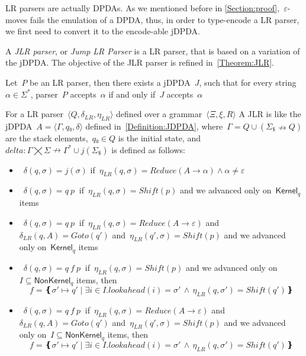 LR parsers are actually DPDAs\@. As we mentioned before in \cref{Section:proof},~$ε$-moves
  fails the emulation of a DPDA, thus, in order to type-encode a LR parser, we first need
  to convert it to the encode-able jDPDA\@.

A \emph{JLR parser}, or \emph{Jump LR Parser} is a LR parser, that
  is based on a variation of the jDPDA\@.
The objective of the JLR parser is refined in~\cref{Theorem:JLR}.

\begin{Theorem}
  \label{Theorem:JLR}
  Let~$P$ be an LR parser, then there exists a jDPDA~$J$,
  such that for every string~$α∈Σ^*$, parser~$P$ accepts~$α$
    if and only if~$J$ accepts~$α$
\end{Theorem}

For a LR parser~$⟨Q,δ_{LR}, η_{LR}⟩$ defined over a grammar~$⟨Ξ,ξ,R⟩$
A JLR is like the jDPDA~$A=⟨Γ,q₀,δ⟩$ defined in~\cref{Definition:JDPDA},
  where~$Γ= Q∪(Σ_\$↛Q)$ are the stack elements,~$q₀∈Q$
  is the initial state, and~$delta:Γ⨉Σ↛Γ^*∪j(Σ_\$)$ is defined as follows:
  \begin{itemize}
   \item~$δ(q,σ)= j(σ)$ if~$η_{LR}(q,σ)=Reduce(A→α)∧α≠ε$


   \item~$δ(q,σ)= q \: p~$ if~$η_{LR}(q,σ)=Shift(p)$ and we advanced only on~$\textsf{Kernel}_q$ items
   \item~$δ(q,σ)= q \: p~$ if~$η_{LR}(q,σ)=Reduce(A→ε)$
     and~$δ_{LR}(q,A)=Goto(q')$ and~$η_{LR}(q',σ)=Shift(p)$
     and we advanced only on~$\textsf{Kernel}_q$ items


   \item~$δ(q,σ)= q \: f \: p~$ if~$η_{LR}(q,σ)=Shift(p)$ and we advanced only on~$I⊆\textsf{NonKernel}_q$
     items, then
    \[
      f = ❴σ' \mapsto q' \; | \;∃i∈I . lookahead(i)=σ' \,∧\, η_{LR}(q,σ')=Shift(q')❵
    \]

   \item~$δ(q,σ)= q \: f \: p~$ if~$η_{LR}(q,σ)=Reduce(A→ε)$
     and~$δ_{LR}(q,A)=Goto(q')$ and~$η_{LR}(q',σ)=Shift(p)$
     and we advanced only on~$I⊆\textsf{NonKernel}_q$
     items, then
     \[
      f = ❴σ' \mapsto q' \; | \;∃i∈I . lookahead(i)=σ' \,∧\, η_{LR}(q,σ')=Shift(q')❵
     \]

  \end{itemize}
